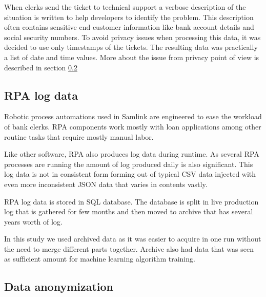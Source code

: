 \documentclass[english, 12pt, a4paper, elec, utf8, a-1b, online]{aaltothesis}
\begin{document}

When clerks send the ticket to technical support
a verbose description of the situation is written
to help developers to identify the problem.
This description often contains sensitive end customer information
like bank account details and social security numbers.
To avoid privacy issues when processing this data,
it was decided to use only timestamps of the tickets.
The resulting data was practically a list of date and time values.
More about the issue from privacy point of view
is described in section \ref{subsec:data-anonymization}


\subsection{RPA log data}\label{subsec:rpa-log-data}
Robotic process automations used in Samlink
are engineered %
to ease the workload of
bank clerks.
RPA components %
work mostly with loan applications %
among other routine tasks
that require mostly manual labor.

Like other software,
RPA also produces log data during runtime.
As several RPA processes are running %
the amount of log produced daily is also significant. %
This log data is not in consistent form
forming out of typical CSV data
injected with even more inconsistent JSON data
that varies in contents vastly.

RPA log data is stored in SQL database.
The database is split in live production log
that is gathered for few months %
and then moved to archive that has
several years worth of log.

In this study we used archived data
as it was easier to acquire in one run
without the need to merge different parts together.
Archive also had %
data that was seen as sufficient amount
for machine learning algorithm training.


\subsection{Data anonymization}\label{subsec:data-anonymization}
\end{document}
